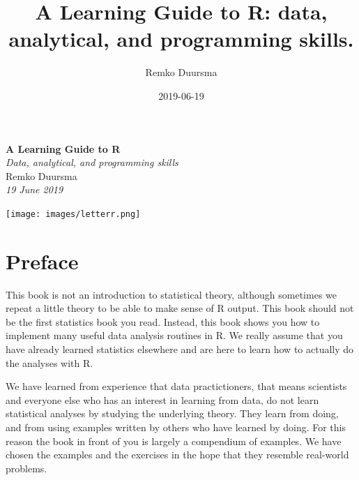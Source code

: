\documentclass[]{book}
\title{A Learning Guide to R: data, analytical, and programming skills.}
\author{Remko Duursma}
\date{2019-06-19}
\let\oldmaketitle\maketitle
\begin{document}
\maketitle

\thispagestyle{empty}
\begin{center}

{ \Huge \textbf{A Learning Guide to R}}\\[0.4cm]
{ \large \textit{Data, analytical, and programming skills}} \\



\bigskip
\large{Remko Duursma}\\
\emph{19 June 2019}
\vfill

\texttt{[image: images/letterr.png]}\\[1cm]

\end{center}


\let\maketitle\oldmaketitle
\maketitle

{
\setcounter{tocdepth}{1}
\tableofcontents
}
\hypertarget{preface}{%
\chapter{Preface}\label{preface}}

This book is not an introduction to statistical theory, although sometimes we repeat a little theory to be able to make sense of R output. This book should not be the first statistics book you read. Instead, this book shows you how to implement many useful data analysis routines in R. We really assume that you have already learned statistics elsewhere and are here to learn how to actually do the analyses with R.

We have learned from experience that data practictioners, that means scientists and everyone else who has an interest in learning from data, do not learn statistical analyses by studying the underlying theory. They learn from doing, and from using examples written by others who have learned by doing. For this reason the book in front of you is largely a compendium of examples. We have chosen the examples and the exercises in the hope that they resemble real-world problems.
\end{document}
